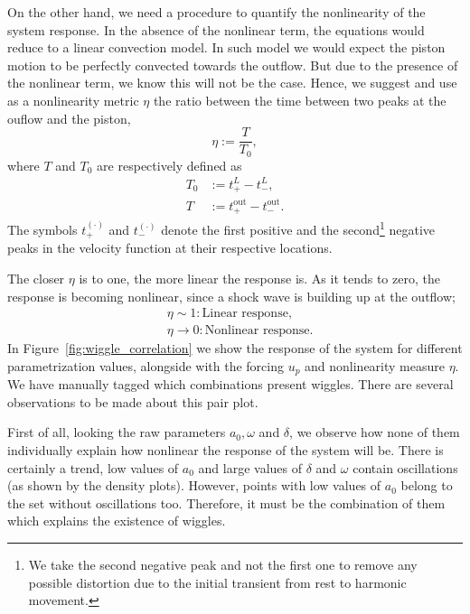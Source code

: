 \documentclass[../../thesis.tex]{subfiles}
\begin{document}
On the other hand, we need a procedure to quantify the nonlinearity of the system response.
In the absence of the nonlinear term, the equations would reduce to a linear convection model.
In such model we would expect the piston motion to be perfectly convected towards the outflow.
But due to the presence of the nonlinear term, we know this will not be the case.
Hence, we suggest and use as a nonlinearity metric $\eta$ the ratio between the time between two peaks at the ouflow and the piston,
\begin{equation}
    \eta := \frac{T}{T_0},
\end{equation}
where $T$ and $T_0$ are respectively defined as
\begin{subequations}
    \begin{align}
        T_0 &:= t^{L}_{+} - t^{L}_{-},
        \\
        T   &:= t^{\text{out}}_{+} - t^{\text{out}}_{-}.
    \end{align}
\end{subequations}
The symbols $t^{(\cdot)}_{+}$ and $t^{(\cdot)}_{-}$ denote the first positive and the second\footnote{We take the second negative peak and not the first one to remove any possible distortion due to the initial transient from rest to harmonic movement.} negative peaks in the velocity function at their respective locations.

The closer $\eta$ is to one, the more linear the response is.
As it tends to zero, the response is becoming nonlinear, 
since a shock wave is building up at the outflow;
\begin{align*}
    &\eta \sim 1 : \text{Linear response}, 
    \\
    &\eta \rightarrow 0 : \text{Nonlinear response}.
\end{align*}
In Figure~\ref{fig:wiggle_correlation} we show the response of the system for different parametrization values, alongside with the forcing $u_p$ and nonlinearity measure $\eta$. 
We have manually tagged which combinations present wiggles.
There are several observations to be made about this pair plot.

First of all, looking the raw parameters $a_0, \omega$ and $\delta$, we observe how 
none of them individually explain how nonlinear the response of the system will be.
There is certainly a trend, low values of $a_0$ and large values of $\delta$ and $\omega$ contain oscillations (as shown by the density plots). 
However, points with low values of $a_0$ belong to the set without oscillations too. 
Therefore, it must be the combination of them which explains the existence of wiggles.
\end{document}
